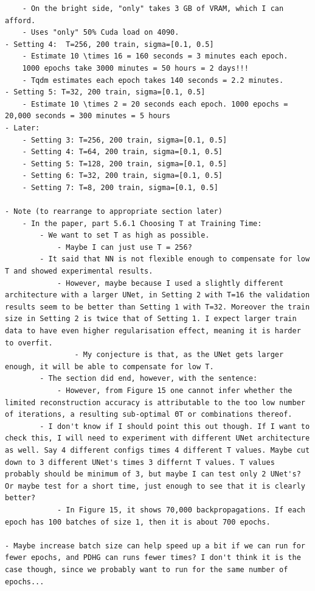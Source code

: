 \documentclass[12pt]{article}
\begin{document}
\begin{verbatim}
    - On the bright side, "only" takes 3 GB of VRAM, which I can afford.
    - Uses "only" 50% Cuda load on 4090.
- Setting 4:  T=256, 200 train, sigma=[0.1, 0.5]
    - Estimate 10 \times 16 = 160 seconds = 3 minutes each epoch.
    1000 epochs take 3000 minutes = 50 hours = 2 days!!!
    - Tqdm estimates each epoch takes 140 seconds = 2.2 minutes.
- Setting 5: T=32, 200 train, sigma=[0.1, 0.5]
    - Estimate 10 \times 2 = 20 seconds each epoch. 1000 epochs = 20,000 seconds = 300 minutes = 5 hours
- Later:
    - Setting 3: T=256, 200 train, sigma=[0.1, 0.5]
    - Setting 4: T=64, 200 train, sigma=[0.1, 0.5]
    - Setting 5: T=128, 200 train, sigma=[0.1, 0.5]
    - Setting 6: T=32, 200 train, sigma=[0.1, 0.5]
    - Setting 7: T=8, 200 train, sigma=[0.1, 0.5]

- Note (to rearrange to appropriate section later)
    - In the paper, part 5.6.1 Choosing T at Training Time:
        - We want to set T as high as possible.
            - Maybe I can just use T = 256?
        - It said that NN is not flexible enough to compensate for low T and showed experimental results.
            - However, maybe because I used a slightly different architecture with a larger UNet, in Setting 2 with T=16 the validation results seem to be better than Setting 1 with T=32. Moreover the train size in Setting 2 is twice that of Setting 1. I expect larger train data to have even higher regularisation effect, meaning it is harder to overfit.
                - My conjecture is that, as the UNet gets larger enough, it will be able to compensate for low T.
        - The section did end, however, with the sentence:
            - However, from Figure 15 one cannot infer whether the limited reconstruction accuracy is attributable to the too low number of iterations, a resulting sub-optimal ΘT or combinations thereof.
        - I don't know if I should point this out though. If I want to check this, I will need to experiment with different UNet architecture as well. Say 4 different configs times 4 different T values. Maybe cut down to 3 different UNet's times 3 differnt T values. T values probably should be minimum of 3, but maybe I can test only 2 UNet's? Or maybe test for a short time, just enough to see that it is clearly better?
            - In Figure 15, it shows 70,000 backpropagations. If each epoch has 100 batches of size 1, then it is about 700 epochs.

- Maybe increase batch size can help speed up a bit if we can run for fewer epochs, and PDHG can runs fewer times? I don't think it is the case though, since we probably want to run for the same number of epochs...


\end{verbatim}
\end{document}

